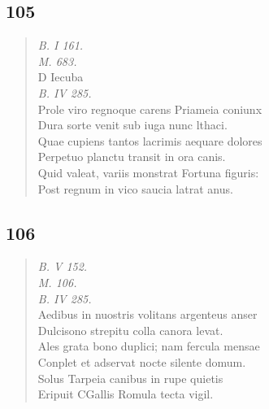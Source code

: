 \documentclass[11pt, a4paper]{report}
\begin{document}
            \subsection*{105}
      \begin{verse}
      \textit{B. I 161.} \\ \textit{M. 683.} \\ D Iecuba \\ \textit{B. IV 285.} \\ Prole viro regnoque carens Priameia coniunx \\ Dura sorte venit sub iuga nunc lthaci. \\ Quae cupiens tantos lacrimis aequare dolores \\ Perpetuo planctu transit in ora canis. \\ Quid valeat, variis monstrat Fortuna figuris: \\ Post regnum in vico saucia latrat anus. \\ 
      \end{verse}
  
            \subsection*{106}
      \begin{verse}
      \textit{B. V 152.} \\ \textit{M. 106.} \\ \textit{B. IV 285.} \\ Aedibus in nuostris volitans argenteus anser \\ Dulcisono strepitu colla canora levat. \\ Ales grata bono duplici; nam fercula mensae \\ Conplet et adservat nocte silente domum. \\ Solus Tarpeia canibus in rupe quietis \\ Eripuit CGallis Romula tecta vigil. \\ 
      \end{verse}
  
\end{document}
